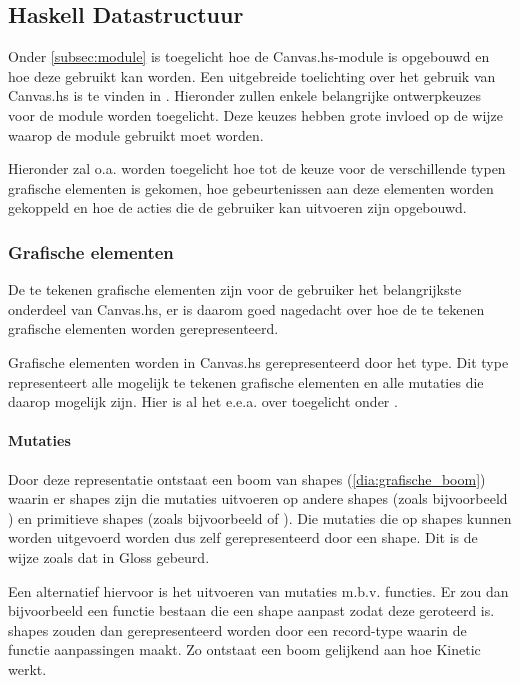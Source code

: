 \subsection{Haskell Datastructuur} \label{subsec:grafische_bibliotheek}
Onder \autoref{subsec:module} is toegelicht hoe de Canvas.hs-module is opgebouwd en hoe deze gebruikt kan worden. Een uitgebreide toelichting over het gebruik van Canvas.hs is te vinden in . Hieronder zullen enkele belangrijke ontwerpkeuzes voor de module worden toegelicht. Deze keuzes hebben grote invloed op de wijze waarop de module gebruikt moet worden. 

Hieronder zal o.a. worden toegelicht hoe tot de keuze voor de verschillende typen grafische elementen is gekomen, hoe gebeurtenissen aan deze elementen worden gekoppeld en hoe de acties die de gebruiker kan uitvoeren zijn opgebouwd.

\subsubsection{Grafische elementen}
De te tekenen grafische elementen zijn voor de gebruiker het belangrijkste onderdeel van Canvas.hs, er is daarom goed nagedacht over hoe de te tekenen grafische elementen worden gerepresenteerd. 

Grafische elementen worden in Canvas.hs gerepresenteerd door het type. Dit type representeert alle mogelijk te tekenen grafische elementen en alle mutaties die daarop mogelijk zijn. Hier is al het e.e.a. over toegelicht onder .

\paragraph{Mutaties}
Door deze representatie ontstaat een boom van shapes (\autoref{dia:grafische_boom}) waarin er shapes zijn die mutaties uitvoeren op andere shapes (zoals bijvoorbeeld ) en primitieve shapes (zoals bijvoorbeeld  of ). Die mutaties die op shapes kunnen worden uitgevoerd worden dus zelf gerepresenteerd door een shape. Dit is de wijze zoals dat in Gloss gebeurd.

Een alternatief hiervoor is het uitvoeren van mutaties m.b.v. functies. Er zou dan bijvoorbeeld een functie  bestaan die een shape aanpast zodat deze geroteerd is. shapes zouden dan gerepresenteerd worden door een record-type waarin de functie aanpassingen maakt. Zo ontstaat een boom gelijkend aan hoe Kinetic werkt.

